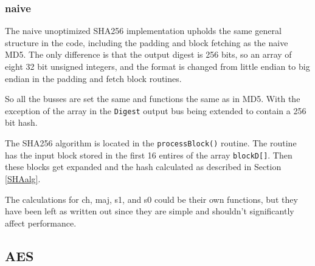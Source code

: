 \documentclass[a4paper]{article}
\begin{document}
\subsubsection{naive}
\label{AESnaive}
The naive unoptimized SHA256 implementation upholds the same general structure in the code, including the padding and block fetching as the naive MD5.
The only difference is that the output digest is 256 bits, so an array of eight 32 bit unsigned integers,
and the format is changed from little endian to big endian in the padding and fetch block routines.

So all the busses are set the same and functions the same as in MD5. With the exception of the array in the \texttt{Digest} output bus being extended to contain a 256 bit hash.

The SHA256 algorithm is located in the \texttt{processBlock()} routine.
The routine has the input block stored in the first 16 entires of the array \texttt{blockD[]}.
Then these blocks get expanded and the hash calculated as described in Section \ref{SHAalg}.

The calculations for ch, maj, s1, and s0 could be their own functions, but they have been left as written out since they are simple and shouldn't significantly affect performance.
\subsection{AES}
\label{sec:org8d3a3f9}
\end{document}
